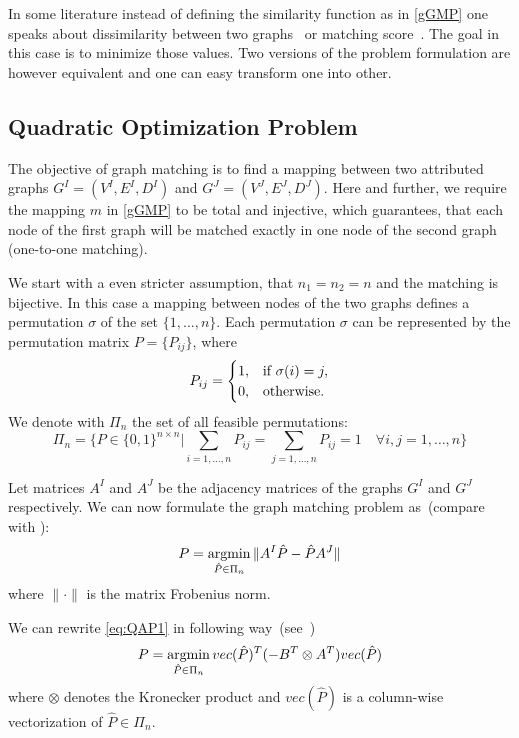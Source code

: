 In some literature instead of defining the similarity function as in \eqref{gGMP} one speaks about dissimilarity between two graphs~ or matching score~. The goal in this case is to minimize those values. Two versions of the problem formulation are however equivalent and one can easy transform one into other.

\subsection{Quadratic Optimization Problem}
The objective of graph matching is to find a mapping between two attributed graphs $G^I = (V^I, E^I,D^I)$ and $G^J = (V^J, E^J,D^J)$. Here and further, we require the mapping $m$ in \eqref{gGMP} to be total and injective, which guarantees, that each node of the first graph will be matched exactly in one node of the second graph (one-to-one matching).

We start with a even stricter assumption, that $n_1=n_2=n$ and the matching is bijective. In this case a mapping between nodes of the two graphs defines a permutation $\sigma$ of the set $\{1,\dots,n\}$. Each permutation $\sigma$ can be represented by the permutation matrix $P=\{P_{ij}\}$, where
\begin{equation*}\centering
P_{ij}=\begin{cases}
 1, & \text{if } \sigma(i)=j, \\
 0, & \text{otherwise.} \\
\end{cases}
\end{equation*}
We denote with $\Pi_n$ the set of all feasible permutations:
\begin{equation*}
\Pi_n=\{P\in\{0,1\}^{n\times n}|\sum_{i=1,\dots,n}P_{ij}=\sum_{j=1,\dots,n}P_{ij}=1\quad\forall i,j=1,\dots,n\}
\end{equation*}

Let matrices $A^I$ and $A^J$ be the adjacency matrices of the graphs $G^I$ and $G^J$ respectively. We can now formulate the graph matching problem as~(compare with \cite{Vogelstein_BrainGraphs}):
\begin{equation} \label{eq:QAP1}
P = \mathop{\rm argmin}_{\hat{P}\in\Pi_n}\|A^I\hat{P}-\hat{P}A^J\|
\end{equation}
where $\|\cdot\|$ is the matrix Frobenius norm.

We can rewrite \eqref{eq:QAP1} in following way~(see~\cite{Burkard98thequadratic})
\begin{equation} \label{eq:QAP2}
P = \mathop{\rm argmin}_{\hat{P}\in\Pi_n}vec(\hat{P})^T(-B^T\otimes A^T)vec(\hat{P})
\end{equation}
where $\otimes$ denotes the Kronecker product and $vec(\hat{P})$ is a column-wise vectorization of $\hat{P}\in\Pi_n$.
 


